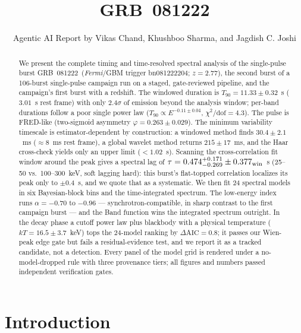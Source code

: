 \documentclass[twocolumn]{aastex631}
\newcommand{\grb}{GRB~081222}
\newcommand{\trig}{bn081222204}
\begin{document}
\title{\grb}

\author{Agentic AI Report by Vikas Chand, Khushboo Sharma, and Jagdish C. Joshi}
\noaffiliation

\begin{abstract}
We present the complete timing and time-resolved spectral analysis of the
single-pulse burst \grb\ (\textit{Fermi}/GBM trigger \trig; $z = 2.77$), the
second burst of a 106-burst single-pulse campaign run on a staged,
gate-reviewed pipeline, and the campaign's first burst with a redshift. The
windowed duration is $T_{90} = 11.33 \pm 0.32$~s ($3.01$~s rest frame) with
only $2.4\sigma$ of emission beyond the analysis window; per-band durations
follow a poor single power law ($T_{90} \propto E^{-0.11 \pm 0.04}$,
$\chi^2/\mathrm{dof} = 4.3$). The pulse is FRED-like (two-sigmoid asymmetry
$\varphi = 0.263 \pm 0.029$). The minimum variability timescale is
estimator-dependent by construction: a windowed method finds $30.4 \pm 2.1$~ms
($\approx 8$~ms rest frame), a global wavelet method returns $215 \pm 17$~ms,
and the Haar cross-check yields only an upper limit ($< 1.02$~s). Scanning the
cross-correlation fit window around the peak gives a spectral lag of
$\tau = 0.474^{+0.171}_{-0.269} \pm 0.377_{\rm win}$~s (25--50 vs.\
100--300~keV, soft lagging hard): this burst's flat-topped correlation
localizes its peak only to $\pm 0.4$~s, and we quote that as a systematic. We
then fit 24 spectral models in six Bayesian-block bins and the time-integrated
spectrum. The low-energy index runs $\alpha = -0.70$ to $-0.96$ ---
synchrotron-compatible, in sharp contrast to the first campaign burst --- and
the Band function wins the integrated spectrum outright. In the decay phase a
cutoff power law plus blackbody with a physical temperature
($kT = 16.5 \pm 3.7$~keV) tops the 24-model ranking by
$\Delta\mathrm{AIC} = 0.8$; it passes our Wien-peak edge gate but fails a
residual-evidence test, and we report it as a tracked candidate, not a
detection. Every panel of the model grid is rendered under a no-model-dropped
rule with three provenance tiers; all figures and numbers passed independent
verification gates.
\end{abstract}


\section{Introduction} \label{sec:intro}
\end{document}

